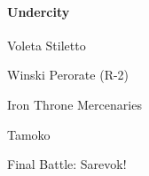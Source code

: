 \documentclass[10pt,a4,twoside]{book}
\begin{document}
\begin{multicols}{3}
\paragraph*{Undercity}
\begin{trivlist}
\item Voleta Stiletto
\item Winski Perorate \textcolor{Mahogany}{(R-2)}
\item Iron Throne Mercenaries
\item Tamoko
\item Final Battle: Sarevok!
\end{trivlist}
\end{multicols}
\end{document}
